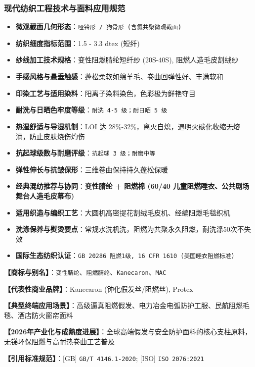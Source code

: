 \documentclass[11pt,openright,twoside,UTF8]{ctexbook}
\begin{document}
\subsubsection*{现代纺织工程技术与面料应用规范}
\begin{itemize} \setlength{\itemsep}{2pt}
    \item \textbf{微观截面几何形态}：\texttt{哑铃形 / 狗骨形 (含氯共聚微观截面)}
    \item \textbf{纺织细度指标范围}：1.5 - 3.3 dtex (短纤)
    \item \textbf{纱线加工技术规格}：变性阻燃腈纶短纤纱 (20S-40S), 阻燃人造毛皮割绒纱
    \item \textbf{手感风格与悬垂触感}：蓬松柔软如绵羊毛、卷曲回弹性好、丰满软和
    \item \textbf{印染工艺与适用染料}：阳离子染料染色，色彩极为鲜艳夺目
    \item \textbf{耐洗与日晒色牢度等级}：\texttt{耐洗 4-5 级；耐日晒 5 级}
    \item \textbf{热湿舒适与导湿机制}：LOI 达 28\%-32\%，离火自熄，遇明火碳化收缩无熔滴，防止皮肤烧伤灼伤
    \item \textbf{抗起球级数与耐磨评级}：\texttt{抗起球 3 级；耐磨中等}
    \item \textbf{弹性伸长与抗皱保形}：三维卷曲保持持久蓬松保暖
    \item \textbf{经典混纺推荐与协同}：\textbf{变性腈纶 + 阻燃棉 (60/40 儿童阻燃睡衣、公共剧场舞台人造毛皮幕布)}
    \item \textbf{适用织造与编织工艺}：大圆机高密提花割绒毛皮机、经编阻燃毛毯织机
    \item \textbf{洗涤保养与熨烫要点}：常规水洗机洗，阻燃为共聚永久阻燃，耐洗涤50次不失效
    \item \textbf{国际生态纺织认证}：\texttt{GB 20286 阻燃1级, 16 CFR 1610 (美国睡衣阻燃标准)}
\end{itemize}
\vspace{0.2cm}

\noindent\textbf{【商标与别名】}：\texttt{变性腈纶}、\texttt{阻燃腈纶}、\texttt{Kanecaron}、\texttt{MAC}\par
\noindent\textbf{【代表性商业品牌】}：Kanecaron (钟化假发丝/阻燃丝), Protex\par
\noindent\textbf{【典型终端应用场景】}：高级逼真阻燃假发、电力冶金电弧防护工服、民航阻燃毛毯、酒店防火窗帘面料\par
\noindent\textbf{【2026年产业化与成熟度进展】}：全球高端假发与安全防护面料的核心支柱原料，无锑环保阻燃与高耐热卷曲工艺普及\par
\noindent\textbf{【引用标准规范】}：[GB] \texttt{GB/T 4146.1-2020}; [ISO] \texttt{ISO 2076:2021}\par
\vspace{0.5cm}
\end{document}
